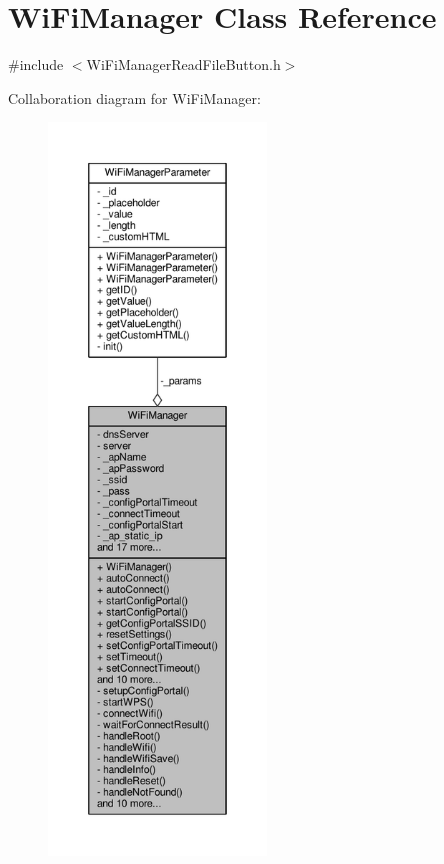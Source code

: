 \hypertarget{class_wi_fi_manager}{}\section{Wi\+Fi\+Manager Class Reference}
\label{class_wi_fi_manager}


{\ttfamily \#include $<$Wi\+Fi\+Manager\+Read\+File\+Button.\+h$>$}



Collaboration diagram for Wi\+Fi\+Manager\+:\nopagebreak
\begin{figure}[H]
\begin{center}
\leavevmode
\includegraphics[height=550pt]{dd/d8d/class_wi_fi_manager__coll__graph}
\end{center}
\end{figure}
